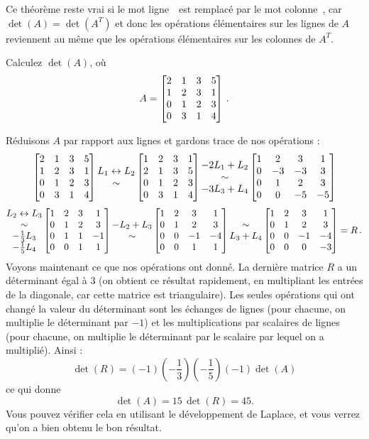 \begin{remark} 
Ce théorème reste vrai si le mot \og ligne\ \fg\ est remplacé par le mot \og colonne\ \fg, car $\det(A)=\det(A^T)$ et donc les op\'erations \'el\'ementaires sur les lignes de $A$ reviennent au même que les op\'erations \'el\'ementaires sur les colonnes de $A^T$. 
\end{remark}
\begin{myprob}
Calculez $\det(A)$, o\`u 
$$
A = \left[ \begin{matrix} 2 & 1 & 3 & 5 \\ 1 & 2 & 3 & 1\\ 0 & 1 & 2 & 3\\ 0 & 3 & 1 & 4 \end{matrix} \right]\,.
$$

\begin{mysol}
Réduisons $A$ par rapport aux lignes et gardons trace de nos opérations :
$$
\left[ \begin{matrix} 
2 & 1 & 3 & 5 \\ 
1 & 2 & 3 & 1\\ 
0 & 1 & 2 & 3\\ 
0 & 3 & 1 & 4 \end{matrix} \right]
\begin{matrix} L_1 \leftrightarrow L_2 \\ \sim \end{matrix}
\left[ \begin{matrix} 
1 & 2 & 3 & 1\\ 
2 & 1 & 3 & 5 \\ 
0 & 1 & 2 & 3\\ 
0 & 3 & 1 & 4 \end{matrix} \right]
\begin{matrix}  -2L_1+L_2 \\ \sim \\ -3L_3+L_4 \end{matrix}
\left[ \begin{matrix} 
1 & 2 & 3 & 1\\ 
0 & -3 & -3 & 3 \\ 
0 & 1 & 2 & 3\\ 
0 & 0 & -5 & -5 \end{matrix} \right]
$$
$$
\begin{matrix} L_2\leftrightarrow L_3\\ \sim \\ -\frac13L_3\\ -\frac15 L_4 \end{matrix}
\left[ \begin{matrix}  
1 & 2 & 3 & 1\\ 
0 & 1 & 2 & 3\\ 
0 & 1 & 1 & -1 \\
0 & 0 & 1 & 1 \end{matrix} \right]
\begin{matrix} -L_2+L_3\\ \sim \end{matrix}
\left[ \begin{matrix}  
1 & 2 & 3 & 1\\ 
0 & 1 & 2 & 3\\ 
0 & 0 & -1 & -4 \\
0 & 0 & 1 & 1 \end{matrix} \right]
\begin{matrix} \sim \\ L_3+L_4 \end{matrix}
\left[ \begin{matrix} 
1 & 2 & 3 & 1\\ 
0 & 1 & 2 & 3\\ 
0 & 0 & -1 & -4 \\
0 & 0 & 0 & -3 \end{matrix} \right]=R\,.
$$
Voyons maintenant ce que nos opérations ont donné.
La dernière matrice $R$ a un déterminant \'egal \`a $3$ (on obtient ce résultat rapidement, en multipliant les
entrées de la diagonale, car cette matrice est triangulaire).  Les seules opérations qui ont changé
la valeur du déterminant sont les \'echanges de lignes (pour chacune, on multiplie le déterminant par $-1$) et les
multiplications par scalaires de lignes (pour chacune, on multiplie le déterminant par le scalaire par lequel on a multiplié). 
Ainsi :
$$
\det(R) = (-1)(-\frac13)(-\frac15)(-1)\det(A)
$$
ce qui donne
$$
\det(A) = 15\,\det(R) = 45.
$$
Vous pouvez v\'erifier cela en utilisant le d\'eveloppement de Laplace, et vous verrez qu'on a bien obtenu le bon résultat.
\end{mysol}\end{myprob}

